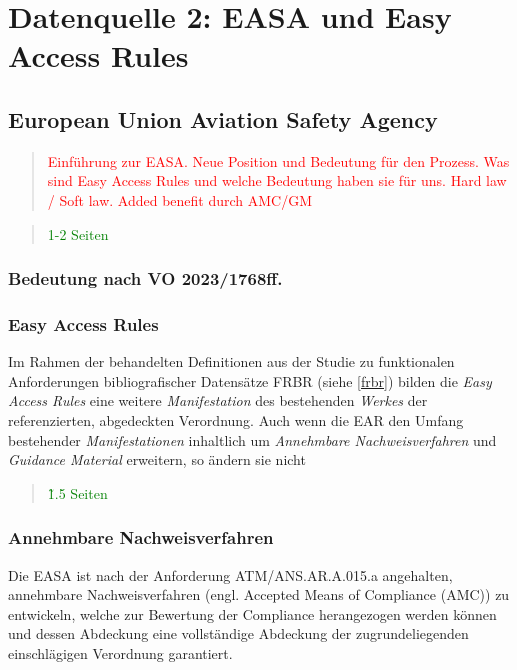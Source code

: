 \chapter{Datenquelle 2: EASA und Easy Access Rules}

    \section{European Union Aviation Safety Agency}

\begin{quote}
\textcolor{red}{Einführung zur EASA. Neue Position und Bedeutung für den Prozess. Was sind Easy Access Rules und welche Bedeutung haben sie für uns. Hard law / Soft law. Added benefit durch AMC/GM}
\end{quote}
\begin{quote}
\textcolor{green}{1-2 Seiten}
\end{quote}

        
        \subsection{Bedeutung nach VO 2023/1768ff.}
        
        \pagebreak
        \subsection{Easy Access Rules}

Im Rahmen der behandelten Definitionen aus der Studie zu funktionalen Anforderungen bibliografischer Datensätze \acs{FRBR} (siehe \ref{frbr}) bilden die \textit{Easy Access Rules} eine weitere \textit{Manifestation} des bestehenden \textit{Werkes} der referenzierten, abgedeckten Verordnung.
Auch wenn die \ac{EAR} den Umfang bestehender \textit{Manifestationen} inhaltlich um \textit{Annehmbare Nachweisverfahren} und \textit{Guidance Material} erweitern, so ändern sie nicht 



\begin{quote}
\textcolor{green}{\~1.5 Seiten}
\end{quote}

        \pagebreak
        \subsection{Annehmbare Nachweisverfahren}

        Die \ac{EASA} ist nach der Anforderung \textsf{ATM/ANS.AR.A.015.a} angehalten, annehmbare Nachweisverfahren (engl. Accepted Means of Compliance (AMC)) zu entwickeln, welche zur Bewertung der Compliance herangezogen werden können und dessen Abdeckung eine vollständige Abdeckung der zugrundeliegenden einschlägigen Verordnung garantiert. 
        \cite[Anh. II]{2017R0373}


